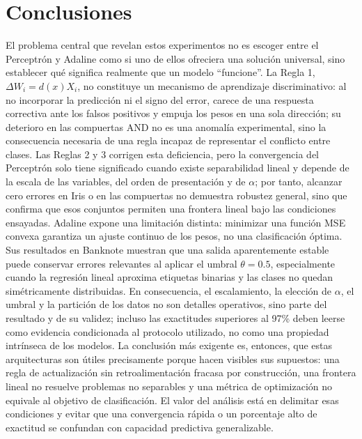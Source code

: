 \documentclass{article}
\begin{document}
\section{Conclusiones}
El problema central que revelan estos experimentos no es escoger entre el Perceptrón y Adaline como si uno de ellos ofreciera una solución universal, sino establecer qué significa realmente que un modelo ``funcione''. La Regla 1, $\Delta W_i = d(x)X_i$, no constituye un mecanismo de aprendizaje discriminativo: al no incorporar la predicción ni el signo del error, carece de una respuesta correctiva ante los falsos positivos y empuja los pesos en una sola dirección; su deterioro en las compuertas AND no es una anomalía experimental, sino la consecuencia necesaria de una regla incapaz de representar el conflicto entre clases. Las Reglas 2 y 3 corrigen esta deficiencia, pero la convergencia del Perceptrón solo tiene significado cuando existe separabilidad lineal y depende de la escala de las variables, del orden de presentación y de $\alpha$; por tanto, alcanzar cero errores en Iris o en las compuertas no demuestra robustez general, sino que confirma que esos conjuntos permiten una frontera lineal bajo las condiciones ensayadas. Adaline expone una limitación distinta: minimizar una función MSE convexa garantiza un ajuste continuo de los pesos, no una clasificación óptima. Sus resultados en Banknote muestran que una salida aparentemente estable puede conservar errores relevantes al aplicar el umbral $\theta = 0.5$, especialmente cuando la regresión lineal aproxima etiquetas binarias y las clases no quedan simétricamente distribuidas. En consecuencia, el escalamiento, la elección de $\alpha$, el umbral y la partición de los datos no son detalles operativos, sino parte del resultado y de su validez; incluso las exactitudes superiores al 97\% deben leerse como evidencia condicionada al protocolo utilizado, no como una propiedad intrínseca de los modelos. La conclusión más exigente es, entonces, que estas arquitecturas son útiles precisamente porque hacen visibles sus supuestos: una regla de actualización sin retroalimentación fracasa por construcción, una frontera lineal no resuelve problemas no separables y una métrica de optimización no equivale al objetivo de clasificación. El valor del análisis está en delimitar esas condiciones y evitar que una convergencia rápida o un porcentaje alto de exactitud se confundan con capacidad predictiva generalizable.

\end{document}
